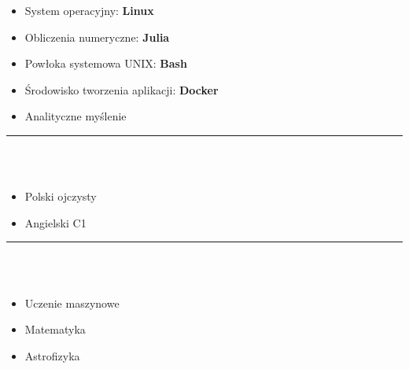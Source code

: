 \documentclass[10pt]{article}
\begin{document}
\begin{minipage}[t]{0.30\textwidth}
\begin{itemize}[leftmargin=*]
            \item System operacyjny: \textbf{Linux}
            \item Obliczenia numeryczne: \textbf{Julia}
            \item Powłoka systemowa UNIX: \textbf{Bash} 
            \item Środowisko tworzenia aplikacji: \textbf{Docker}
            \item Analityczne myślenie
        \end{itemize}
        \rule{6cm}{1pt} \\ \\
        \fontsize{10pt}{10pt}
        \begin{itemize}[leftmargin=*]
            \setlength{\parskip}{0pt}
            \item Polski ojczysty
            \item Angielski C1
        \end{itemize}
        \rule{6cm}{1pt} \\ \\
        \fontsize{10pt}{10pt}
        \begin{itemize}[leftmargin=*]
            \setlength{\parskip}{0pt}
            \item Uczenie maszynowe
            \item Matematyka
            \item Astrofizyka
        \end{itemize}
    \end{minipage}
    \hfill %
\end{document}
